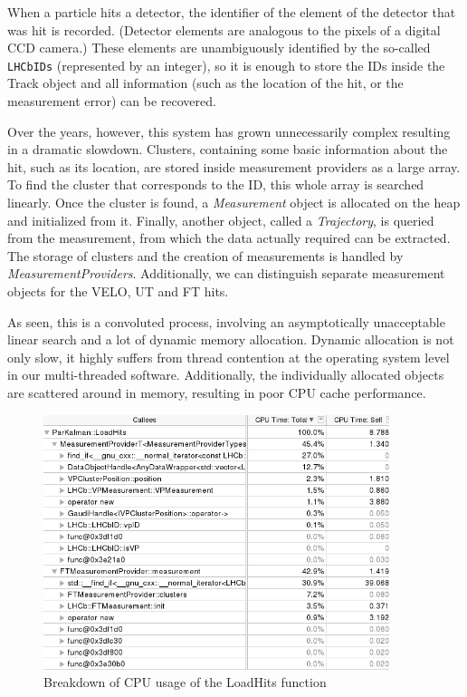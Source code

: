 \documentclass[12pt]{article}
\newcommand{\code}[1]{\texttt{#1}}
\begin{document}
When a particle hits a detector, the identifier of the element of the detector that was hit is recorded. (Detector elements are analogous to the pixels of a digital CCD camera.) These elements are unambiguously identified by the so-called \code{LHCbIDs} (represented by an integer), so it is enough to store the IDs inside the Track object and all information (such as the location of the hit, or the measurement error) can be recovered. 

Over the years, however, this system has grown unnecessarily complex resulting in a dramatic slowdown. Clusters, containing some basic information about the hit, such as its location, are stored inside measurement providers as a large array. To find the cluster that corresponds to the ID, this whole array is searched linearly. Once the cluster is found, a \textit{Measurement} object is allocated on the heap and initialized from it. Finally, another object, called a \textit{Trajectory}, is queried from the measurement, from which the data actually required can be extracted. The storage of clusters and the creation of measurements is handled by \textit{MeasurementProviders}. Additionally, we can distinguish separate measurement objects for the VELO, UT and FT hits.

As seen, this is a convoluted process, involving an asymptotically unacceptable linear search and a lot of dynamic memory allocation. Dynamic allocation is not only slow, it highly suffers from thread contention at the operating system level in our multi-threaded software. Additionally, the individually allocated objects are scattered around in memory, resulting in poor CPU cache performance.

\begin{figure}[H]
	\begin{center}
		\includegraphics[width=0.9\textwidth]{kalmanfit_loadhits_breakdown}
	\end{center}
	\caption{Breakdown of CPU usage of the LoadHits function}
	\label{fig_kalmanfit_loadhits_breakdown}
\end{figure}
\end{document}
